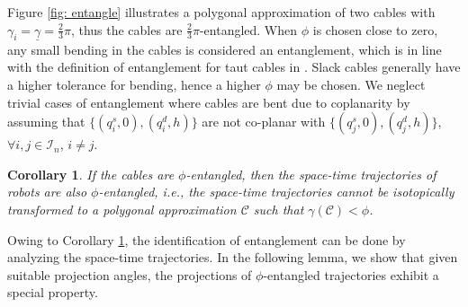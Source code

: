 \documentclass[conference]{IEEEtran}
\newtheorem{lem}[thm]{Lemma}
\newtheorem{cor}[thm]{Corollary}
\newcommand*{\myset}[1]{\mathcal{#1}} %
\newcommand*{\config}{q} %
\newcommand*{\projang}{\alpha} %
\newcommand*{\projplane}{\myset{P}} %
\newcommand*{\entangle}{\gamma} %
\newcommand*{\entangledef}{\phi} %
\newcommand*{\polyapprox}{\myset{C}}
\begin{document}
Figure \ref{fig: entangle} illustrates a polygonal approximation of two cables with $\entangle_i=\underline{\entangle}=\frac{2}{3}\pi$, thus the cables are $\frac{2}{3}\pi$-entangled.
When $\entangledef$ is chosen close to zero, any small bending in the cables is considered an entanglement, which is in line with the definition of entanglement for taut cables in \cite{hert1999motion}.
Slack cables generally have a higher tolerance for bending, hence a higher $\entangledef$ may be chosen.
We neglect trivial cases of entanglement where cables are bent due to coplanarity by
assuming that $\{(\config_i^s,0),(\config_i^d,h)\}$ are not co-planar with $\{(\config_j^s,0),(\config_j^d,h)\}$, $\forall i,j\in\myset{I}_n$, $i\neq j$.

\begin{cor}\label{cor: spacetime}
If the cables are $\entangledef$-entangled, then the space-time trajectories of robots are also $\entangledef$-entangled, i.e., the space-time trajectories cannot be isotopically transformed to a polygonal approximation $\polyapprox$ such that $\entangle(\polyapprox)<\entangledef$.
\end{cor}

Owing to Corollary \ref{cor: spacetime}, the identification of entanglement can be done by analyzing the space-time trajectories.
In the following lemma, we show that given suitable projection angles, 
the projections of $\entangledef$-entangled trajectories exhibit a special property.
    
\end{document}
